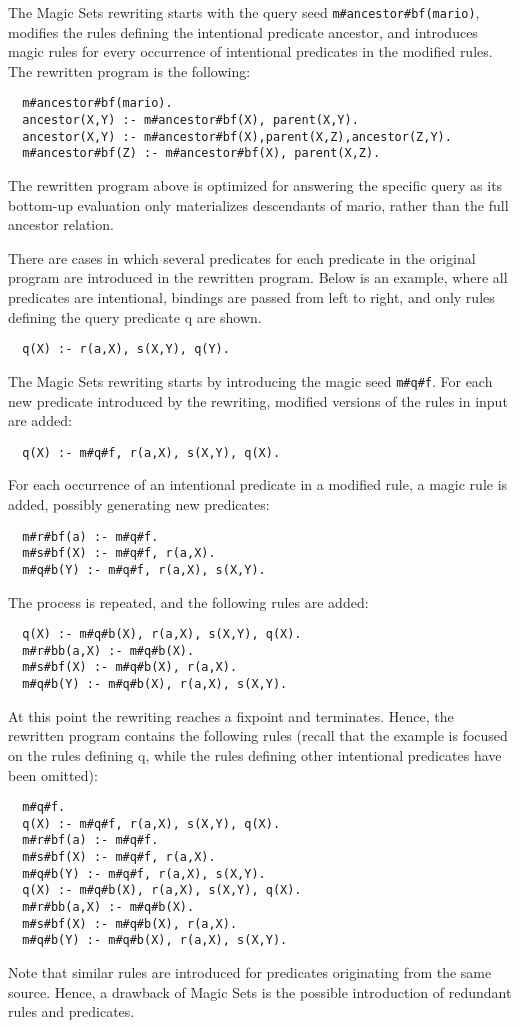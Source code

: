 \documentclass[oneside]{book}
\begin{document}
The Magic Sets rewriting starts with the query seed {\tt m\#ancestor\#bf(mario)}, modifies the rules defining the intentional predicate ancestor, and introduces magic rules for every occurrence of intentional predicates in the modified rules. The rewritten program is the following:
\begin{verbatim}
  m#ancestor#bf(mario).
  ancestor(X,Y) :- m#ancestor#bf(X), parent(X,Y).
  ancestor(X,Y) :- m#ancestor#bf(X),parent(X,Z),ancestor(Z,Y).
  m#ancestor#bf(Z) :- m#ancestor#bf(X), parent(X,Z).
\end{verbatim}

The rewritten program above is optimized for answering the specific query as its bottom-up evaluation only materializes descendants of mario, rather than the full ancestor relation.

There are cases in which several predicates for each predicate in the original program are introduced in the rewritten program. Below is an example, where all predicates are intentional, bindings are passed from left to right, and only rules defining the query predicate q are shown.
\begin{verbatim}
  q(X) :- r(a,X), s(X,Y), q(Y).
\end{verbatim}

The Magic Sets rewriting starts by introducing the magic seed {\tt m\#q\#f}. For each new predicate introduced by the rewriting, modified versions of the rules in input are added:
\begin{verbatim}
  q(X) :- m#q#f, r(a,X), s(X,Y), q(X).
\end{verbatim}
For each occurrence of an intentional predicate in a modified rule, a magic rule is added, possibly generating new predicates:
\begin{verbatim}
  m#r#bf(a) :- m#q#f.
  m#s#bf(X) :- m#q#f, r(a,X).
  m#q#b(Y) :- m#q#f, r(a,X), s(X,Y).
\end{verbatim}
The process is repeated, and the following rules are added:
\begin{verbatim}
  q(X) :- m#q#b(X), r(a,X), s(X,Y), q(X).
  m#r#bb(a,X) :- m#q#b(X).
  m#s#bf(X) :- m#q#b(X), r(a,X).
  m#q#b(Y) :- m#q#b(X), r(a,X), s(X,Y).
\end{verbatim}
At this point the rewriting reaches a fixpoint and terminates. Hence, the rewritten program contains the following rules (recall that the example is focused on the rules defining q, while the rules defining other intentional predicates have been omitted):
\begin{verbatim}
  m#q#f.
  q(X) :- m#q#f, r(a,X), s(X,Y), q(X).
  m#r#bf(a) :- m#q#f.
  m#s#bf(X) :- m#q#f, r(a,X).
  m#q#b(Y) :- m#q#f, r(a,X), s(X,Y).
  q(X) :- m#q#b(X), r(a,X), s(X,Y), q(X).
  m#r#bb(a,X) :- m#q#b(X).
  m#s#bf(X) :- m#q#b(X), r(a,X).
  m#q#b(Y) :- m#q#b(X), r(a,X), s(X,Y).
\end{verbatim}
Note that similar rules are introduced for predicates originating from the same source. Hence, a drawback of Magic Sets is the possible introduction of redundant rules and predicates.
\end{document}
